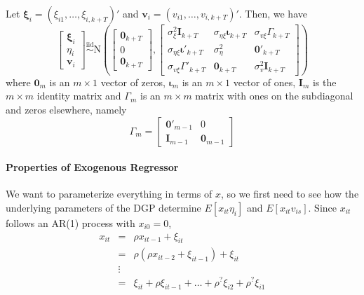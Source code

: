 \documentclass[12pt]{article}
\begin{document}
Let $\boldsymbol{\xi}_i = (\xi_{i1}, \hdots, \xi_{i,k+T})'$ and $\boldsymbol{v}_i = (v_{i1}, \hdots, v_{i,k+T})'$. Then, we have
  $$\left[ \begin{array}{c} \boldsymbol{\xi}_i \\ \eta_i \\ \boldsymbol{v}_i \end{array} \right] \overset{\mbox{iid}}{\sim} \mbox{N}\left(\left[\begin{array}{l} \mathbf{0}_{k+T} \\ 0 \\ \mathbf{0}_{k+T} \end{array}\right], \left[ \begin{array}{ccc}\sigma^2_{\xi} \mathbf{I}_{k+T} & \sigma_{\eta \xi}\boldsymbol{\iota}_{k+T}& \sigma_{v\xi} \Gamma_{k+T}\\\sigma_{\eta \xi}\boldsymbol{\iota}'_{k+T} & \sigma^2_{\eta} & \mathbf{0}'_{k+T} \\ \sigma_{v\xi} \Gamma'_{k+T} & \mathbf{0}_{k+T}& \sigma_v^2 \mathbf{I}_{k+T}\end{array}\right] \right)$$
where $\mathbf{0}_m$ is an $m\times 1$ vector of zeros, $\boldsymbol{\iota}_m$ is an $m\times 1$ vector of ones, $\mathbf{I}_m$ is the $m\times m$ identity matrix and $\Gamma_m$ is an $m\times m$ matrix with ones on the subdiagonal and zeros elsewhere, namely
  $$\Gamma_m = \left[ \begin{array}{cc} \mathbf{0}'_{m-1} & 0 \\ \mathbf{I}_{m-1} & \mathbf{0}_{m-1}\end{array}\right]$$

\paragraph{Properties of Exogenous Regressor} We want to parameterize everything in terms of $x$, so we first need to see how the underlying parameters of the DGP determine $E[x_{it}\eta_i]$ and $E[x_{it}v_{is}]$. Since $x_{it}$ follows an AR(1) process with $x_{i0} = 0$, 
  \begin{eqnarray*}
    x_{it} &=& \rho x_{it-1} + \xi_{it} \\
          &=& \rho(\rho x_{it-2} + \xi_{it-1}) + \xi_{it}\\
          &\vdots&\\
          &=& \xi_{it} + \rho \xi_{it-1} + \hdots +\rho^{?} \xi_{i2} + \rho^{?}\xi_{i1} 
  \end{eqnarray*}
 
\end{document}
